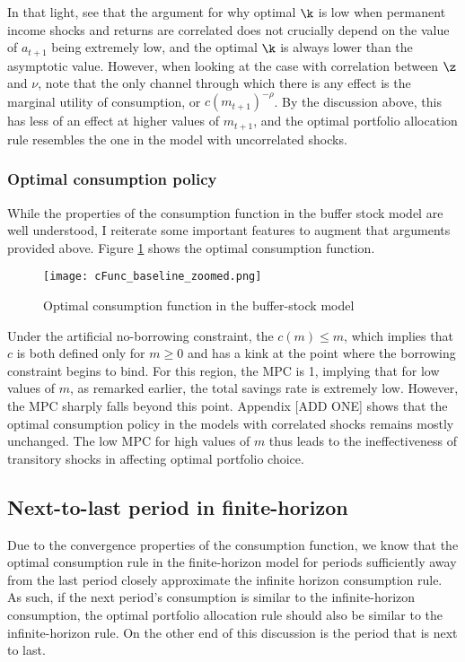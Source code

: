 In that light, see that the argument for why optimal $\k$ is low when permanent income shocks and returns are correlated does not crucially depend on the value of $a_{t+1}$ being extremely low, and the optimal $\k$ is always lower than the asymptotic value. However, when looking at the case with correlation between $\z$ and $\nu$, note that the only channel through which there is any effect is the marginal utility of consumption, or $c(m_{t+1})^{-\rho}$. By the discussion above, this has less of an effect at higher values of $m_{t+1}$, and the optimal portfolio allocation rule resembles the one in the model with uncorrelated shocks.

\subsubsection{Optimal consumption policy}\label{consumption_baseline}

While the properties of the consumption function in the buffer stock model are well understood, I reiterate some important features to augment that arguments provided above. Figure \ref{fig:baseline_consumption} shows the optimal consumption function.

\begin{figure}[h]
    \texttt{[image: cFunc\_baseline\_zoomed.png]}
    \caption{Optimal consumption function in the buffer-stock model}
    \label{fig:baseline_consumption}
\end{figure}

Under the artificial no-borrowing constraint, the $c(m) \leq m$, which implies that $c$ is both defined only for $m \geq 0$ and has a kink at the point where the borrowing constraint begins to bind. For this region, the MPC is 1, implying that for low values of $m$, as remarked earlier, the total  savings rate is extremely low. However, the MPC sharply falls beyond this point. Appendix [ADD ONE] shows that the optimal consumption policy in the models with correlated shocks remains mostly unchanged. The low MPC for high values of $m$ thus leads to the ineffectiveness of transitory shocks in affecting optimal portfolio choice.

\subsection{Next-to-last period in finite-horizon}\label{finite_horizon}

Due to the convergence properties of the consumption function, we know that the optimal consumption rule in the finite-horizon model for periods sufficiently away from the last period closely approximate the infinite horizon consumption rule. As such, if the next period's consumption is similar to the infinite-horizon consumption, the optimal portfolio allocation rule should also be similar to the infinite-horizon rule. On the other end of this discussion is the period that is next to last.

